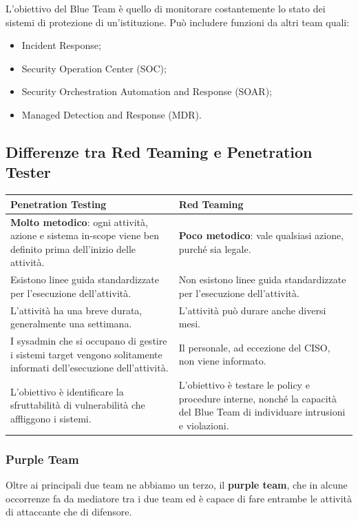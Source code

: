 \documentclass{article}
\begin{document}
L’obiettivo del Blue Team è quello di monitorare costantemente lo stato dei sistemi di protezione di un’istituzione. Può includere funzioni da altri team quali:
\begin{itemize}
    \item Incident Response;
    \item Security Operation Center (SOC);
    \item Security Orchestration Automation and Response (SOAR);
    \item Managed Detection and Response (MDR).
\end{itemize}

\subsection{Differenze tra Red Teaming e Penetration Tester}
\begin{table}[h]
    \centering
    \begin{tabular}{|m{7 cm}|  m{7 cm}|}
        \hline
        \textbf{Penetration Testing} & \textbf{Red Teaming}\\
        \hline
        \textbf{Molto metodico}: ogni attività, azione e sistema in-scope viene ben definito prima dell’inizio delle attività. & \textbf{Poco metodico}: vale qualsiasi azione, purché sia legale.\\
        \hline
        Esistono linee guida standardizzate per l’esecuzione dell’attività. & Non esistono linee guida standardizzate per l’esecuzione dell’attività.\\
        \hline
        L’attività ha una breve durata, generalmente una settimana. & L’attività può durare anche diversi mesi.\\
        \hline
        I sysadmin che si occupano di gestire i sistemi target vengono solitamente informati dell’esecuzione dell’attività. & Il personale, ad eccezione del CISO, non viene informato.\\
        \hline
        L’obiettivo è identificare la sfruttabilità di vulnerabilità che affliggono i sistemi. & L’obiettivo è testare le policy e procedure interne, nonché la capacità del Blue Team di individuare intrusioni e violazioni.\\
        \hline
    \end{tabular}
\end{table}

\subsubsection{Purple Team}
Oltre ai principali due team ne abbiamo un terzo, il \textbf{purple team}, che in alcune occorrenze fa da mediatore tra i due team ed è capace di fare entrambe le attività di attaccante che di difensore.
\end{document}
